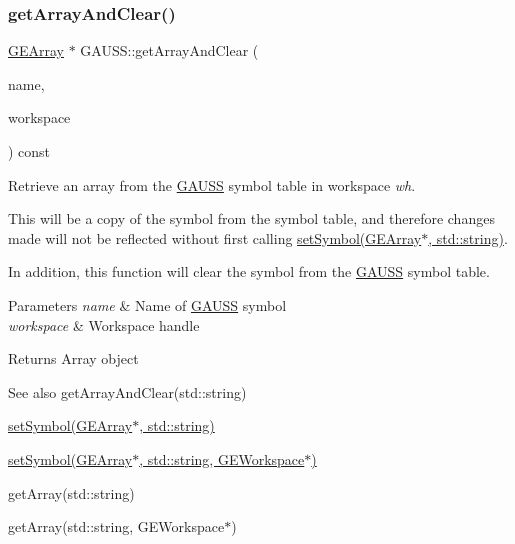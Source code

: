 \subsubsection{\texorpdfstring{get\+Array\+And\+Clear()}{getArrayAndClear()}\hspace{0.1cm}{\footnotesize\ttfamily [2/2]}}
{\footnotesize\ttfamily \hyperlink{class_g_e_array}{G\+E\+Array} $\ast$ G\+A\+U\+S\+S\+::get\+Array\+And\+Clear (\begin{DoxyParamCaption}\item[{std\+::string}]{name,  }\item[{\hyperlink{class_g_e_workspace}{G\+E\+Workspace} $\ast$}]{workspace }\end{DoxyParamCaption}) const}



Retrieve an array from the \hyperlink{class_g_a_u_s_s}{G\+A\+U\+SS} symbol table in workspace {\itshape wh}. 

This will be a copy of the symbol from the symbol table, and therefore changes made will not be reflected without first calling \hyperlink{class_g_a_u_s_s_a328c6fadd097c46b0651d1985c12759d}{set\+Symbol(\+G\+E\+Array$\ast$, std\+::string)}.

In addition, this function will clear the symbol from the \hyperlink{class_g_a_u_s_s}{G\+A\+U\+SS} symbol table.


\begin{DoxyParams}{Parameters}
{\em name} & Name of \hyperlink{class_g_a_u_s_s}{G\+A\+U\+SS} symbol \\
\hline
{\em workspace} & Workspace handle \\
\hline
\end{DoxyParams}
\begin{DoxyReturn}{Returns}
Array object
\end{DoxyReturn}
\begin{DoxySeeAlso}{See also}
get\+Array\+And\+Clear(std\+::string) 

\hyperlink{class_g_a_u_s_s_a328c6fadd097c46b0651d1985c12759d}{set\+Symbol(\+G\+E\+Array$\ast$, std\+::string)} 

\hyperlink{class_g_a_u_s_s_a0b47905610cb724bd9d6b69ef57ddc60}{set\+Symbol(\+G\+E\+Array$\ast$, std\+::string, G\+E\+Workspace$\ast$)} 

get\+Array(std\+::string) 

get\+Array(std\+::string, G\+E\+Workspace$\ast$) 
\end{DoxySeeAlso}
\mbox{\label{class_g_a_u_s_s_a214b7c251ff80099c04a49e5b5032926}} 
